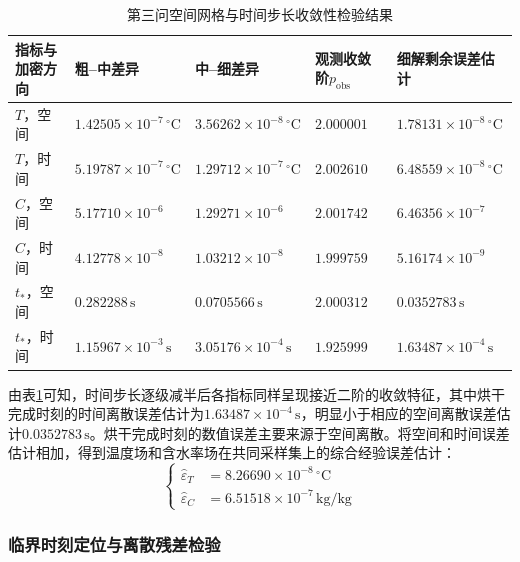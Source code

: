 \documentclass[withoutpreface,bwprint]{cumcmthesis}
\begin{document}
\begin{table}[H]
\centering
\small
\renewcommand{\arraystretch}{1.15}
\caption{第三问空间网格与时间步长收敛性检验结果}
\label{tab:q3-convergence}
\begin{tabularx}{\textwidth}{>{\centering\arraybackslash}p{} >{\centering\arraybackslash}X >{\centering\arraybackslash}X >{\centering\arraybackslash}p{} >{\centering\arraybackslash}X}
\hline
指标与加密方向 & 粗--中差异 & 中--细差异 & 观测收敛阶$p_{\mathrm{obs}}$ & 细解剩余误差估计\\
\hline
$T$，空间 & $1.42505\times10^{-7}\,{}^\circ\mathrm C$ & $3.56262\times10^{-8}\,{}^\circ\mathrm C$ & $2.000001$ & $1.78131\times10^{-8}\,{}^\circ\mathrm C$\\
$T$，时间 & $5.19787\times10^{-7}\,{}^\circ\mathrm C$ & $1.29712\times10^{-7}\,{}^\circ\mathrm C$ & $2.002610$ & $6.48559\times10^{-8}\,{}^\circ\mathrm C$\\
$C$，空间 & $5.17710\times10^{-6}$ & $1.29271\times10^{-6}$ & $2.001742$ & $6.46356\times10^{-7}$\\
$C$，时间 & $4.12778\times10^{-8}$ & $1.03212\times10^{-8}$ & $1.999759$ & $5.16174\times10^{-9}$\\
$t_*$，空间 & $0.282288\,\mathrm s$ & $0.0705566\,\mathrm s$ & $2.000312$ & $0.0352783\,\mathrm s$\\
$t_*$，时间 & $1.15967\times10^{-3}\,\mathrm s$ & $3.05176\times10^{-4}\,\mathrm s$ & $1.925999$ & $1.63487\times10^{-4}\,\mathrm s$\\
\hline
\end{tabularx}
\end{table}

由表\ref{tab:q3-convergence}可知，时间步长逐级减半后各指标同样呈现接近二阶的收敛特征，其中烘干完成时刻的时间离散误差估计为$1.63487\times10^{-4}\,\mathrm s$，明显小于相应的空间离散误差估计$0.0352783\,\mathrm s$。烘干完成时刻的数值误差主要来源于空间离散。将空间和时间误差估计相加，得到温度场和含水率场在共同采样集上的综合经验误差估计：
\begin{equation}
\left\{
\begin{aligned}
\widehat\varepsilon_T&=8.26690\times10^{-8}\,{}^\circ\mathrm C\\
\widehat\varepsilon_C&=6.51518\times10^{-7}\,\mathrm{kg/kg}
\end{aligned}
\right.
\label{eq:q3-field-error-estimates}
\end{equation}

\subsubsection{临界时刻定位与离散残差检验}
\end{document}
